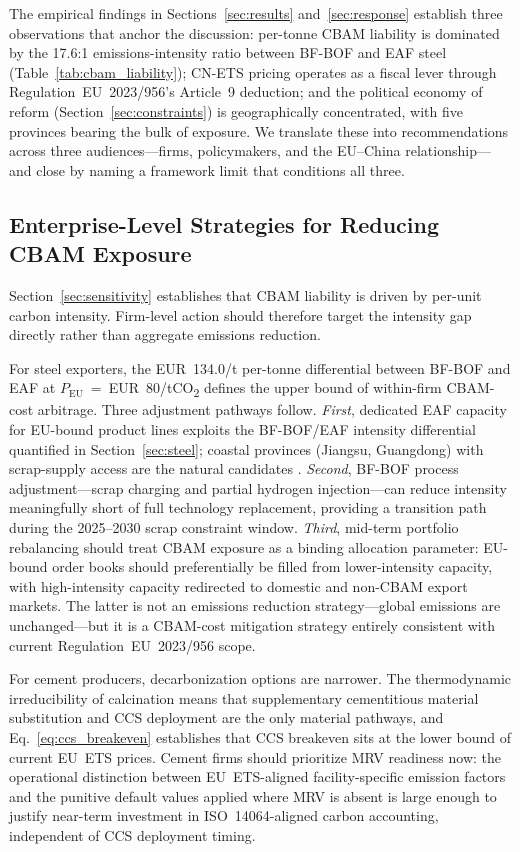 \documentclass[letterpaper, 10pt, conference]{ieeeconf}
\begin{document}
The empirical findings in Sections~\ref{sec:results}
and~\ref{sec:response} establish three observations that anchor the
discussion: per-tonne CBAM liability is dominated by the 17.6:1
emissions-intensity ratio between BF-BOF and EAF steel
(Table~\ref{tab:cbam_liability}); CN-ETS pricing operates as a fiscal
lever through Regulation~EU~2023/956's Article~9 deduction; and the
political economy of reform (Section~\ref{sec:constraints}) is
geographically concentrated, with five provinces bearing the bulk of
exposure. We translate these into recommendations across three
audiences---firms, policymakers, and the EU--China relationship---and
close by naming a framework limit that conditions all three.

\subsection{Enterprise-Level Strategies for Reducing CBAM Exposure}
\label{sec:enterprise}

Section~\ref{sec:sensitivity} establishes that CBAM liability is
driven by per-unit carbon intensity. Firm-level action should
therefore target the intensity gap directly rather than aggregate
emissions reduction.

For steel exporters, the EUR~134.0/t per-tonne differential between
BF-BOF and EAF at $P_{\mathrm{EU}}$~=~EUR~80/tCO\textsubscript{2}
defines the upper bound of within-firm CBAM-cost arbitrage. Three
adjustment pathways follow. \emph{First}, dedicated EAF capacity
for EU-bound product lines exploits the BF-BOF/EAF intensity
differential quantified in Section~\ref{sec:steel}; coastal provinces
(Jiangsu, Guangdong) with scrap-supply access are the natural
candidates \citep{Chen2023}. \emph{Second}, BF-BOF process
adjustment---scrap charging and partial hydrogen injection---can
reduce intensity meaningfully short of full technology replacement,
providing a transition path during the 2025--2030 scrap constraint
window. \emph{Third}, mid-term portfolio rebalancing should treat
CBAM exposure as a binding allocation parameter: EU-bound order books
should preferentially be filled from lower-intensity capacity, with
high-intensity capacity redirected to domestic and non-CBAM export
markets. The latter is not an emissions reduction strategy---global
emissions are unchanged---but it is a CBAM-cost mitigation strategy
entirely consistent with current Regulation~EU~2023/956 scope.

For cement producers, decarbonization options are narrower. The
thermodynamic irreducibility of calcination means that supplementary
cementitious material substitution and CCS deployment are the only
material pathways, and Eq.~\ref{eq:ccs_breakeven} establishes that
CCS breakeven sits at the lower bound of current EU~ETS prices.
Cement firms should prioritize MRV readiness now: the operational
distinction between EU~ETS-aligned facility-specific emission factors
and the punitive default values applied where MRV is absent is large
enough to justify near-term investment in ISO~14064-aligned carbon
accounting, independent of CCS deployment timing.
\end{document}
